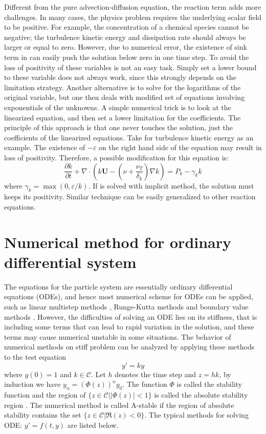 Different from the pure advection-diffusion equation, the reaction term adds more challenges. In many cases, the physics problem requires the underlying scalar field to be positive. For example, the concentration of a chemical species cannot be negative; the turbulence kinetic energy and dissipation rate should always be larger or equal to zero. However, due to numerical error, the existence of sink term in  can easily push the solution below zero in one time step. To avoid the loss of positivity of these variables is not an easy task. Simply set a lower bound to these variable does not always work, since this strongly depends on the limitation strategy. Another alternative is to solve for the logarithms of the original variable, but one then deals with modified set of equations involving exponentials of the unknowns. A simple numerical trick is to look at the linearized equation, and then set a lower limitation for the coefficients. The principle of this approach is that one never touches the solution, just the coefficients of the linearized equations. Take  for turbulence kinetic energy as an example. The existence of $-\varepsilon$ on the right hand side of the equation may result in loss of positivity. Therefore, a possible modification for this equation is:
\begin{equation}
\frac{\partial k}{\partial t}
+\nabla\cdot(k\mathbf{U}
-(\nu+\frac{\nu_T}{\delta_k})\nabla k) 
= P_k - \gamma_k k
\label{eq:k_eqn}
\end{equation}
where $\gamma_k = \max(0, \varepsilon/k)$. If  is solved with implicit method, the solution must keeps its positivity. Similar technique can be easily generalized to other reaction equations.

\section{Numerical method for ordinary differential system}
The equations for the particle system are essentially ordinary differential equations (ODEs), and hence most numerical scheme for ODEs can be applied, such as linear multistep methods \cite{Butcher2003Numerical}, Runge-Kutta methods \cite{Butcher2003Numerical} and boundary value methods \cite{Brugnano1998Boundary}. However, the difficulties of solving an ODE lies on its stiffness, that is including some terms that can lead to rapid variation in the solution, and these terms may cause numerical unstable in some situations. The behavior of numerical methods on stiff problem can be analyzed by applying these methods to the test equation
\begin{equation}
y' = k y
\label{test_eqn}
\end{equation}   
where $y(0) = 1$ and $k \in \mathcal{C}$. Let $h$ denotes the time step and $z = hk$, by induction we have $y_n = (\Phi(z))^ny_0$. The function $\Phi$ is called the stability function \cite{Butcher2003Numerical} and the region of $\{z\in \mathcal{C}| |\Phi(z)| < 1\}$ is called the absolute stability region \cite{Butcher2003Numerical}. The numerical method is called A-stable if the region of absolute stability contains the set $\{ z \in \mathcal{C}| \Re(z) < 0\}$. The typical methods for solving ODE: $y' = f(t,y)$ are listed below.

